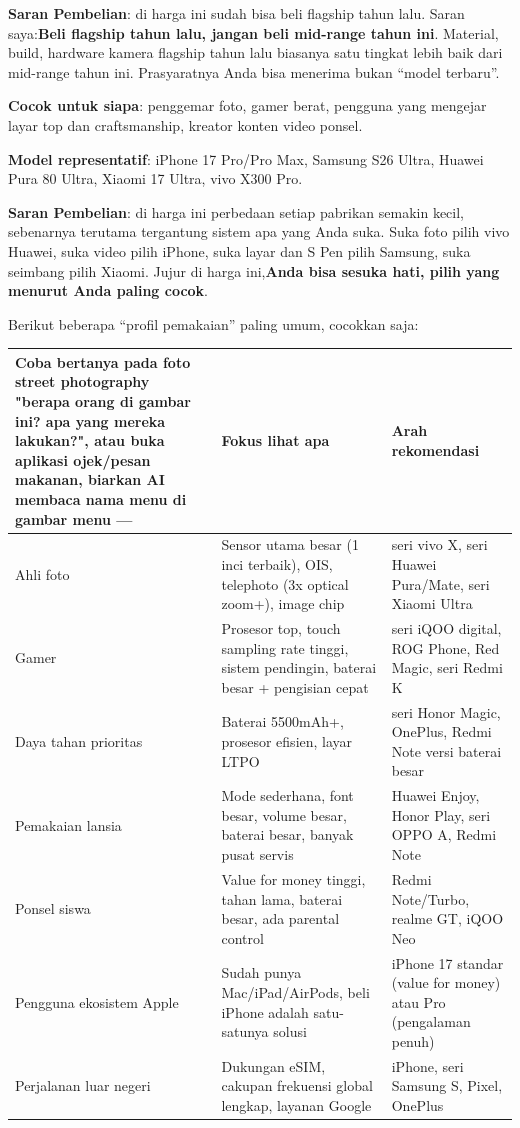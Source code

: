 \textbf{Saran Pembelian}: di harga ini sudah bisa beli flagship tahun lalu. Saran saya:\textbf{Beli flagship tahun lalu, jangan beli mid-range tahun ini}. Material, build, hardware kamera flagship tahun lalu biasanya satu tingkat lebih baik dari mid-range tahun ini. Prasyaratnya Anda bisa menerima bukan “model terbaru”.


\textbf{Cocok untuk siapa}: penggemar foto, gamer berat, pengguna yang mengejar layar top dan craftsmanship, kreator konten video ponsel.

\textbf{Model representatif}: iPhone 17 Pro/Pro Max, Samsung S26 Ultra, Huawei Pura 80 Ultra, Xiaomi 17 Ultra, vivo X300 Pro.

\textbf{Saran Pembelian}: di harga ini perbedaan setiap pabrikan semakin kecil, sebenarnya terutama tergantung sistem apa yang Anda suka. Suka foto pilih vivo Huawei, suka video pilih iPhone, suka layar dan S Pen pilih Samsung, suka seimbang pilih Xiaomi. Jujur di harga ini,\textbf{Anda bisa sesuka hati, pilih yang menurut Anda paling cocok}.


Berikut beberapa “profil pemakaian” paling umum, cocokkan saja:

\begin{center}
\begin{tabularx}{\linewidth}{|X|X|X|}
\hline
\textbf{Coba bertanya pada foto street photography "berapa orang di gambar ini? apa yang mereka lakukan?", atau buka aplikasi ojek/pesan makanan, biarkan AI membaca nama menu di gambar menu —} & \textbf{Fokus lihat apa} & \textbf{Arah rekomendasi} \tabularnewline
\hline
Ahli foto & Sensor utama besar (1 inci terbaik), OIS, telephoto (3x optical zoom+), image chip & seri vivo X, seri Huawei Pura/Mate, seri Xiaomi Ultra \tabularnewline
Gamer & Prosesor top, touch sampling rate tinggi, sistem pendingin, baterai besar + pengisian cepat & seri iQOO digital, ROG Phone, Red Magic, seri Redmi K \tabularnewline
Daya tahan prioritas & Baterai 5500mAh+, prosesor efisien, layar LTPO & seri Honor Magic, OnePlus, Redmi Note versi baterai besar \tabularnewline
Pemakaian lansia & Mode sederhana, font besar, volume besar, baterai besar, banyak pusat servis & Huawei Enjoy, Honor Play, seri OPPO A, Redmi Note \tabularnewline
Ponsel siswa & Value for money tinggi, tahan lama, baterai besar, ada parental control & Redmi Note/Turbo, realme GT, iQOO Neo \tabularnewline
Pengguna ekosistem Apple & Sudah punya Mac/iPad/AirPods, beli iPhone adalah satu-satunya solusi & iPhone 17 standar (value for money) atau Pro (pengalaman penuh) \tabularnewline
Perjalanan luar negeri & Dukungan eSIM, cakupan frekuensi global lengkap, layanan Google & iPhone, seri Samsung S, Pixel, OnePlus \tabularnewline
\hline
\end{tabularx}
\end{center}

